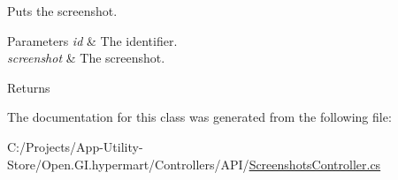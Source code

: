 Puts the screenshot. 


\begin{DoxyParams}{Parameters}
{\em id} & The identifier.\\
\hline
{\em screenshot} & The screenshot.\\
\hline
\end{DoxyParams}
\begin{DoxyReturn}{Returns}

\end{DoxyReturn}


The documentation for this class was generated from the following file\+:\begin{DoxyCompactItemize}
\item 
C\+:/\+Projects/\+App-\/\+Utility-\/\+Store/\+Open.\+G\+I.\+hypermart/\+Controllers/\+A\+P\+I/\hyperlink{_screenshots_controller_8cs}{Screenshots\+Controller.\+cs}\end{DoxyCompactItemize}
